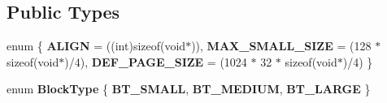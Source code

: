 \subsection*{Public Types}
\begin{DoxyCompactItemize}
\item 
enum \{ {\bfseries A\+L\+I\+GN} = ((int)sizeof(void$\ast$)), 
{\bfseries M\+A\+X\+\_\+\+S\+M\+A\+L\+L\+\_\+\+S\+I\+ZE} = (128 $\ast$ sizeof(void$\ast$)/4), 
{\bfseries D\+E\+F\+\_\+\+P\+A\+G\+E\+\_\+\+S\+I\+ZE} = (1024 $\ast$ 32 $\ast$ sizeof(void$\ast$)/4)
 \}\hypertarget{class_object_script_1_1_o_s_heap_manager_aa398c5237ed59956b728664ece5a6eb5}{}\label{class_object_script_1_1_o_s_heap_manager_aa398c5237ed59956b728664ece5a6eb5}

\item 
enum {\bfseries Block\+Type} \{ {\bfseries B\+T\+\_\+\+S\+M\+A\+LL}, 
{\bfseries B\+T\+\_\+\+M\+E\+D\+I\+UM}, 
{\bfseries B\+T\+\_\+\+L\+A\+R\+GE}
 \}\hypertarget{class_object_script_1_1_o_s_heap_manager_a22d3ac9430bb39e8361290eef5298050}{}\label{class_object_script_1_1_o_s_heap_manager_a22d3ac9430bb39e8361290eef5298050}

\end{DoxyCompactItemize}
